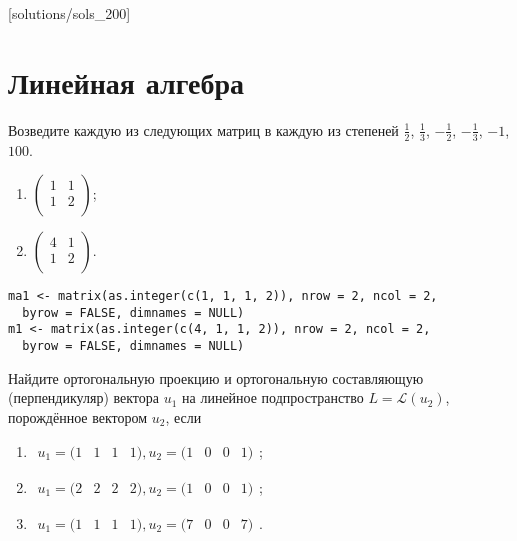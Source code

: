 [solutions/sols_200]

\chapter{Линейная алгебра}

\begin{problem}
Возведите каждую из следующих матриц в каждую из степеней $\frac{1}{2}$, $\frac{1}{3}$, $-\frac{1}{2}$, $-\frac{1}{3}$, $-1$, $100$.
\begin{enumerate}
\item $\begin{pmatrix}{}
    1 &   1 \\ 
    1 &   2 \\ 
  \end{pmatrix}$;
\item $\begin{pmatrix}{}
    4 &   1 \\ 
    1 &   2 \\ 
  \end{pmatrix}$.
\end{enumerate}


\begin{sol}
\begin{verbatim}
ma1 <- matrix(as.integer(c(1, 1, 1, 2)), nrow = 2, ncol = 2,
  byrow = FALSE, dimnames = NULL)
m1 <- matrix(as.integer(c(4, 1, 1, 2)), nrow = 2, ncol = 2,
  byrow = FALSE, dimnames = NULL)
\end{verbatim}

\end{sol}
\end{problem}



\begin{problem}
Найдите ортогональную проекцию и ортогональную составляющую (перпендикуляр) вектора $u_1$ на линейное подпространство $L = \mathcal{L}(u_2)$, порождённое вектором $u_2$, если
\begin{enumerate}
\item $\begin{matrix} u_1 = (1 & 1 & 1 & 1), u_2 = (1 & 0 & 0 & 1) \end{matrix}$;
\item $\begin{matrix} u_1 = (2 & 2 & 2 & 2), u_2 = (1 & 0 & 0 & 1) \end{matrix}$;
\item $\begin{matrix} u_1 = (1 & 1 & 1 & 1), u_2 = (7 & 0 & 0 & 7) \end{matrix}$.
\end{enumerate}


\begin{sol}
\end{sol}
\end{problem}



